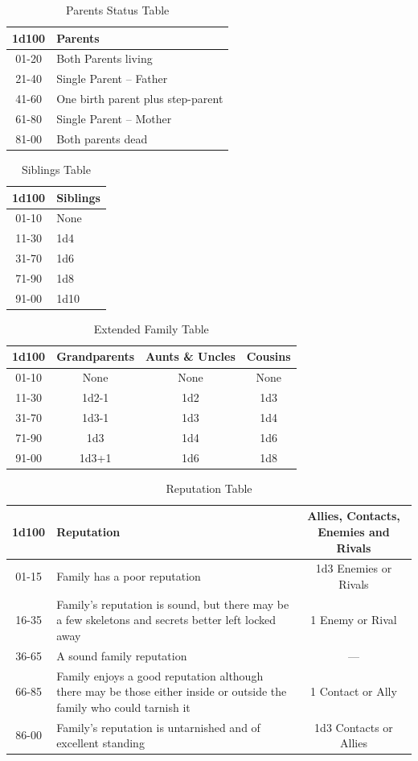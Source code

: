 \documentclass[10pt]{article}
\begin{document}
\begin{longtable}{|c|l|}
\caption{Parents Status Table}
\label{tab:parents-status}\\
\hline
\textbf{1d100} & \textbf{Parents} \\
\hline
01-20 & Both Parents living \\
\hline
21-40 & Single Parent – Father \\
\hline
41-60 & One birth parent plus step-parent \\
\hline
61-80 & Single Parent – Mother \\
\hline
81-00 & Both parents dead \\
\hline
\end{longtable}

\begin{longtable}{|c|l|}
\caption{Siblings Table}
\label{tab:siblings}\\
\hline
\textbf{1d100} & \textbf{Siblings} \\
\hline
01-10 & None \\
\hline
11-30 & 1d4 \\
\hline
31-70 & 1d6 \\
\hline
71-90 & 1d8 \\
\hline
91-00 & 1d10 \\
\hline
\end{longtable}

\begin{longtable}{|c|c|c|c|}
\caption{Extended Family Table}
\label{tab:extended-family}\\
\hline
\textbf{1d100} & \textbf{Grandparents} & \textbf{Aunts \& Uncles} & \textbf{Cousins} \\
\hline
01-10 & None & None & None \\
\hline
11-30 & 1d2-1 & 1d2 & 1d3 \\
\hline
31-70 & 1d3-1 & 1d3 & 1d4 \\
\hline
71-90 & 1d3 & 1d4 & 1d6 \\
\hline
91-00 & 1d3+1 & 1d6 & 1d8 \\
\hline
\end{longtable}

\begin{longtable}{|c|l|c|}
\caption{Reputation Table}
\label{tab:reputation}\\
\hline
\textbf{1d100} & \textbf{Reputation} & \textbf{Allies, Contacts, Enemies and Rivals} \\
\hline
01-15 & Family has a poor reputation & 1d3 Enemies or Rivals \\
\hline
16-35 & Family's reputation is sound, but there may be a few skeletons and secrets better left locked away & 1 Enemy or Rival \\
\hline
36-65 & A sound family reputation & — \\
\hline
66-85 & Family enjoys a good reputation although there may be those either inside or outside the family who could tarnish it & 1 Contact or Ally \\
\hline
86-00 & Family's reputation is untarnished and of excellent standing & 1d3 Contacts or Allies \\
\hline
\end{longtable}
\end{document}
